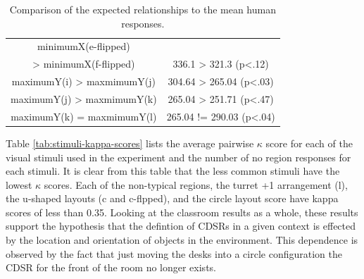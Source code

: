 \documentclass[11pt,letterpaper]{article}
\begin{document}
\begin{table}[t]
{\begin{tabular}{c c}
minimumX(e-flipped)  &  \\
 > minimumX(f-flipped) & 336.1 > 321.3 (p<.12) \\
maximumY(i) > maxmimumY(j) & 304.64 > 265.04 (p<.03) \\
maximumY(j) > maxmimumY(k) & 265.04 > 251.71 (p<.47) \\
maximumY(k) = maxmimumY(l) & 265.04 != 290.03 (p<.04) \\
\hline
\end{tabular}
\label{tab:region-location-tests}
\caption{Comparison of the expected relationships to the mean human responses.}
}
\end{table}




Table \ref{tab:stimuli-kappa-scores} lists the average pairwise $\kappa$ score for each of the visual stimuli used in the experiment and the number of no region responses for each stimuli.  It is clear from this table that the less common stimuli have the lowest $\kappa$ scores.  Each of the non-typical regions, the turret +1 arrangement (l), the u-shaped layouts (c and c-flpped), and the circle layout score have kappa scores of less than 0.35. Looking at the classroom results as a whole, these results support the hypothesis that the defintion of CDSRs in a given context is effected by the location and orientation of objects in the environment.  This dependence is observed by the fact that just moving the desks into a circle configuration the CDSR for the front of the room no longer exists.
\end{document}
